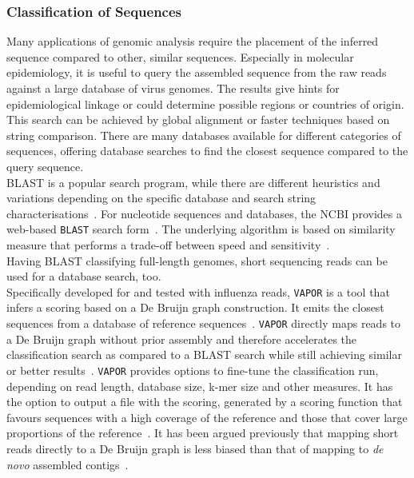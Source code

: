 \subsubsection*{Classification of Sequences}
Many applications of genomic analysis require the placement of the inferred sequence compared to other, similar sequences. Especially in molecular epidemiology, it is useful to query the assembled sequence from the raw reads against a large database of virus genomes. The results give hints for epidemiological linkage or could determine possible regions or countries of origin. This search can be achieved by global alignment or faster techniques based on string comparison. There are many databases available for different categories of sequences, offering database searches to find the closest sequence compared to the query sequence. \\
\ac{BLAST} is a popular search program, while there are different heuristics and variations depending on the specific database and search string characterisations~\cite{altschul1990basic}. For nucleotide sequences and databases, the \ac{NCBI} provides a web-based \texttt{\ac{BLAST}} search form~\cite{altschul1997gapped, johnson2008ncbi}. The underlying algorithm is based on similarity measure that performs a trade-off between speed and sensitivity~\cite{altschul1997gapped}. \\
Having \ac{BLAST} classifying full-length genomes, short sequencing reads can be used for a database search, too.\\
Specifically developed for and tested with influenza reads, \texttt{VAPOR} is a tool that infers a scoring based on a De Bruijn graph construction. It emits the closest sequences from a database of reference sequences~\cite{southgate2020influenza}. \texttt{VAPOR} directly maps reads to a De Bruijn graph without prior assembly and therefore accelerates the classification search as compared to a \ac{BLAST} search while still achieving similar or better results~\cite{southgate2020influenza}. \texttt{VAPOR} provides options to fine-tune the classification run, depending on read length, database size, k-mer size and other measures. It has the option to output a file with the scoring, generated by a scoring function that favours sequences with a high coverage of the reference and those that cover large proportions of the reference~\cite{southgate2020influenza}. It has been argued previously that mapping short reads directly to a De Bruijn graph is less biased than that of mapping to \textit{de novo} assembled contigs~\cite{limasset2016read}.


